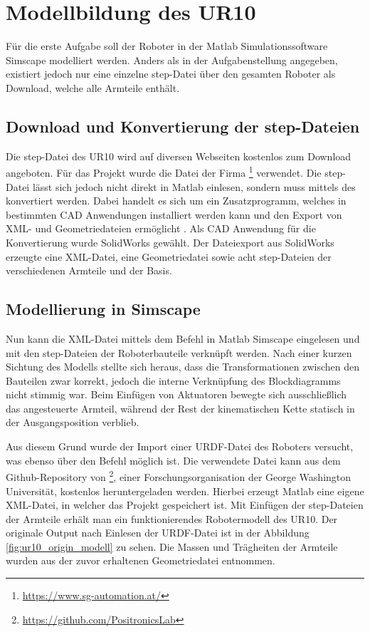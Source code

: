 \section{Modellbildung des UR10}

Für die erste Aufgabe soll der Roboter in der Matlab Simulationssoftware Simscape modelliert werden.
Anders als in der Aufgabenstellung angegeben, existiert jedoch nur eine einzelne step-Datei über den gesamten Roboter als Download, welche alle Armteile enthält.


\subsection{Download und Konvertierung der step-Dateien}
Die step-Datei des UR10 wird auf diversen Webseiten kostenlos zum Download angeboten.
Für das Projekt wurde die Datei der Firma \footnote{\url{https://www.sg-automation.at/}} verwendet.
Die step-Datei lässt sich jedoch nicht direkt in Matlab einlesen, sondern muss mittels des  konvertiert werden.
Dabei handelt es sich um ein Zusatzprogramm, welches in bestimmten CAD Anwendungen installiert werden kann und den Export von XML- und Geometriedateien ermöglicht \cite{sm_plugin}.
Als CAD Anwendung für die Konvertierung wurde SolidWorks gewählt. 
Der Dateiexport aus SolidWorks erzeugte eine XML-Datei, eine Geometriedatei  sowie acht step-Dateien der verschiedenen Armteile und der Basis.


\subsection{Modellierung in Simscape}

Nun kann die XML-Datei mittels dem Befehl  in Matlab Simscape eingelesen und mit den step-Dateien der Roboterbauteile verknüpft werden.
Nach einer kurzen Sichtung des Modells stellte sich heraus, dass die Transformationen zwischen den Bauteilen zwar korrekt, jedoch die interne Verknüpfung des Blockdiagramms nicht stimmig war.
Beim Einfügen von Aktuatoren bewegte sich ausschließlich das angesteuerte Armteil, während der Rest der kinematischen Kette statisch in der Ausgangsposition verblieb. 

Aus diesem Grund wurde der Import einer URDF-Datei des Roboters versucht, was ebenso über den Befehl  möglich ist.
Die verwendete Datei kann aus dem Github-Repository von \footnote{\url{https://github.com/PositronicsLab}}, einer Forschungsorganisation der George Washington Universität, kostenlos heruntergeladen werden.
Hierbei erzeugt Matlab eine eigene XML-Datei, in welcher das Projekt gespeichert ist.
Mit Einfügen der step-Dateien der Armteile erhält man ein funktionierendes Robotermodell des UR10. 
Der originale Output nach Einlesen der URDF-Datei ist in der Abbildung \ref{fig:ur10_origin_modell} zu sehen.
Die Massen und Trägheiten der Armteile wurden aus der zuvor erhaltenen Geometriedatei entnommen.


